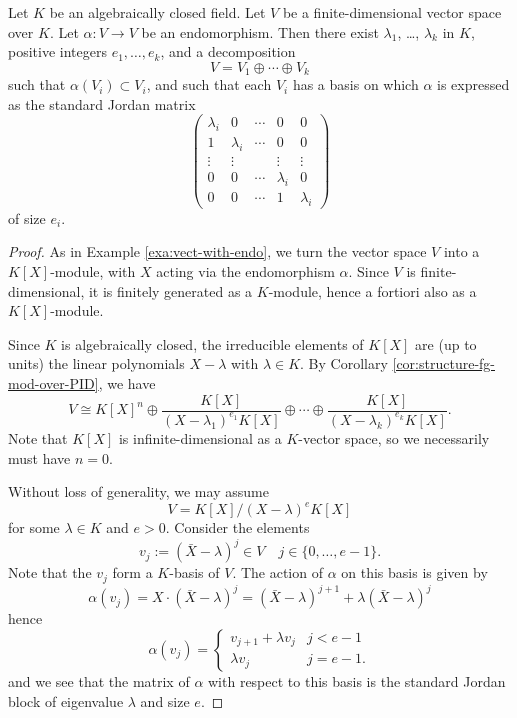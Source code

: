 \begin{theorem}Let $K$ be an algebraically closed field. Let $V$ be a finite-dimensional vector space over $K$. Let $\alpha \colon V\to V$ be an endomorphism. Then there exist $\lambda_1$, \ldots, $\lambda_k$ in $K$, positive integers $e_1,\ldots, e_k$, and a decomposition
\[
	V = V_1 \oplus \cdots \oplus V_k
\]
such that $\alpha(V_i)\subset V_i$, and such that each $V_i$ has a basis on which $\alpha$ is expressed
as the standard Jordan matrix
\[
\left(\begin{matrix} \lambda_i & 0 &   \cdots & 0 & 0 \\ 
	1 & \lambda_i &  \cdots & 0 & 0 \\
	\vdots & \vdots &  & \vdots & \vdots \\ 
	0 & 0 &  \cdots & \lambda_i & 0 \\
	0 & 0 &   \cdots & 1& \lambda_i \end{matrix} \right)
\] 
of size $e_i$.
\end{theorem}

\begin{proof}
As in Example \ref{exa:vect-with-endo}, we turn the vector space $V$ into a $K[X]$-module, with $X$ acting via the endomorphism $\alpha$. Since $V$ is finite-dimensional, it is finitely generated as a $K$-module, hence a fortiori also as a $K[X]$-module.

Since $K$ is algebraically closed, the irreducible elements of $K[X]$ are (up to units) the linear polynomials
$X-\lambda$ with $\lambda \in K$. By Corollary \ref{cor:structure-fg-mod-over-PID}, we have
\[
	V\cong K[X]^n \oplus \frac{K[X]}{(X-\lambda_1)^{e_1}K[X]} \oplus \cdots \oplus
	\frac{K[X]}{(X-\lambda_k)^{e_k} K[X]}.
\]
Note that $K[X]$ is infinite-dimensional as a $K$-vector space, so we necessarily must have $n=0$.

Without loss of generality, we may assume 
\[
	V = K[X]/(X-\lambda)^{e}K[X]
\]
for some $\lambda \in K$ and $e > 0$. Consider the elements
\[
	v_j := (\bar{X}-\lambda)^j \in V \quad j \in \{0,\ldots, e-1\}.
\]
Note that the $v_j$ form a $K$-basis of $V$. The action of $\alpha$ on this basis is given by
\[
	\alpha(v_j) = X \cdot (\bar{X}-\lambda)^j
	= (\bar{X}-\lambda)^{j+1} + \lambda (\bar{X}-\lambda)^j
\]
hence
\[
	\alpha(v_j) = \begin{cases}
	 v_{j+1} + \lambda v_j & j<e-1 \\
	 \lambda v_j & j = e-1.
	 \end{cases}
\]
and we see that the matrix of $\alpha$ with respect to this basis is the standard Jordan block of eigenvalue $\lambda$ and size $e$.
\end{proof}


